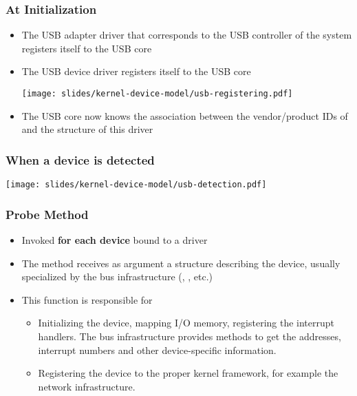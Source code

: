 \begin{frame}
  \frametitle{At Initialization}
  \begin{itemize}
  \item The USB adapter driver that corresponds to the USB controller
    of the system registers itself to the USB core
  \item The  USB device driver registers itself to the USB core
    \begin{center}
      \texttt{[image: slides/kernel-device-model/usb-registering.pdf]}
    \end{center}
  \item The USB core now knows the association between the
    vendor/product IDs of  and the  structure
    of this driver
  \end{itemize}
\end{frame}

\begin{frame}
  \frametitle{When a device is detected}
  \begin{center}
    \texttt{[image: slides/kernel-device-model/usb-detection.pdf]}
  \end{center}
\end{frame}

\begin{frame}
  \frametitle{Probe Method}
  \begin{itemize}
  \item Invoked {\bf for each device} bound to a driver
  \item The  method receives as argument a structure
    describing the device, usually specialized by the bus
    infrastructure (, , etc.)
  \item This function is responsible for
    \begin{itemize}
    \item Initializing the device, mapping I/O memory, registering the
      interrupt handlers. The bus infrastructure provides methods to
      get the addresses, interrupt numbers and other device-specific
      information.
    \item Registering the device to the proper kernel framework, for
      example the network infrastructure.
    \end{itemize}
  \end{itemize}
\end{frame}

